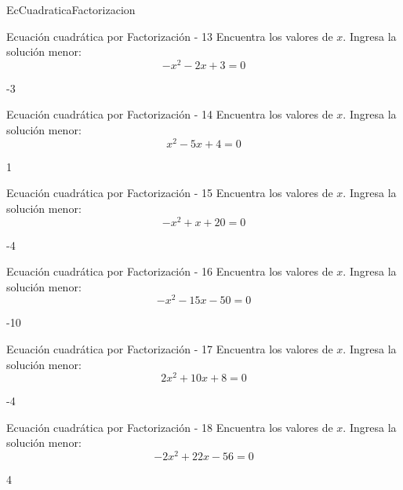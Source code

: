 \documentclass[a4,11pt]{aleph-notas}
\begin{document}
\begin{quiz}{EcCuadraticaFactorizacion}
\begin{numerical}[]%
    {Ecuación cuadrática por Factorización - 13}
    Encuentra los valores de $x$. Ingresa la solución menor:
    \[
        - x^{2} - 2 x + 3 = 0
    \]
    \item[] -3
\end{numerical}

\begin{numerical}[]%
    {Ecuación cuadrática por Factorización - 14}
    Encuentra los valores de $x$. Ingresa la solución menor:
    \[
        x^{2} - 5 x + 4 = 0
    \]
    \item[] 1
\end{numerical}

\begin{numerical}[]%
    {Ecuación cuadrática por Factorización - 15}
    Encuentra los valores de $x$. Ingresa la solución menor:
    \[
        - x^{2} + x + 20 = 0
    \]
    \item[] -4
\end{numerical}

\begin{numerical}[]%
    {Ecuación cuadrática por Factorización - 16}
    Encuentra los valores de $x$. Ingresa la solución menor:
    \[
        - x^{2} - 15 x - 50 = 0
    \]
    \item[] -10
\end{numerical}

\begin{numerical}[]%
    {Ecuación cuadrática por Factorización - 17}
    Encuentra los valores de $x$. Ingresa la solución menor:
    \[
        2 x^{2} + 10 x + 8 = 0
    \]
    \item[] -4
\end{numerical}

\begin{numerical}[]%
    {Ecuación cuadrática por Factorización - 18}
    Encuentra los valores de $x$. Ingresa la solución menor:
    \[
        - 2 x^{2} + 22 x - 56 = 0
    \]
    \item[] 4
\end{numerical}


\end{quiz}
\end{document}
